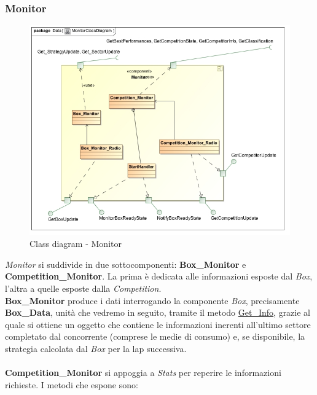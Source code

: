 \subsubsection{Monitor}
\begin{center}
\begin{figure}[h!]
	\includegraphics[scale=0.50]{img/ClassDiagrams/MonitorClassDiagram.jpg}
\caption{Class diagram - Monitor}
\end{figure}
\end{center}
\emph{Monitor} si suddivide in due sottocomponenti: \textbf{Box\_Monitor} e \textbf{Competition\_Monitor}. La prima \`{e} dedicata alle informazioni
esposte dal \emph{Box}, l'altra a quelle esposte dalla \emph{Competition}.\\
\textbf{Box\_Monitor} produce i dati interrogando la componente \emph{Box}, precisamente \textbf{Box\_Data}, unit\`{a} che vedremo in seguito,
tramite il metodo \underline{Get\_Info}, grazie al quale si ottiene un oggetto che contiene le informazioni inerenti all'ultimo settore
completato dal concorrente (comprese le medie di consumo) e, se disponibile, la strategia calcolata dal \emph{Box} per la lap successiva.\\\\
\textbf{Competition\_Monitor} si appoggia a \emph{Stats} per reperire le informazioni richieste. I metodi che espone sono:
